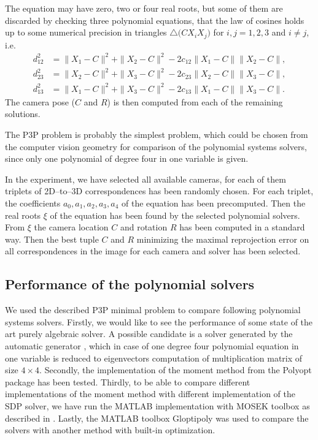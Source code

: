 The equation  may have zero, two or four real roots, but some of them are discarded by checking three polynomial equations, that the law of cosines holds up to some numerical precision in triangles $\triangle\big(CX_iX_j\big)$ for $i,j=1,2,3$ and $i\neq j$, i.e.
\begin{align}
  d_{12}^2 &= \|X_1-C\|^2 + \|X_2-C\|^2 - 2c_{12}\|X_1-C\|\|X_2-C\|,\\
  d_{23}^2 &= \|X_2-C\|^2 + \|X_3-C\|^2 - 2c_{23}\|X_2-C\|\|X_3-C\|,\\
  d_{13}^2 &= \|X_1-C\|^2 + \|X_3-C\|^2 - 2c_{13}\|X_1-C\|\|X_3-C\|.
\end{align}
The camera pose ($C$ and $R$) is then computed from each of the remaining solutions.

The P3P problem is probably the simplest problem, which could be chosen from the computer vision geometry for comparison of the polynomial systems solvers, since only one polynomial of degree four in one variable is given.


In the experiment, we have selected all available \importAppPPPNumCameras{} cameras, for each of them \importAppPPPNumPoints{} triplets of 2D--to--3D correspondences has been randomly chosen.
For each triplet, the coefficients $a_0, a_1, a_2, a_3, a_4$ of the equation  has been precomputed.
Then the real roots $\xi$  of the equation  has been found by the selected polynomial solvers.
From $\xi$ the camera location $C$ and rotation $R$ has been computed in a standard way.
Then the best tuple $C$ and $R$ minimizing the maximal reprojection error on all correspondences in the image for each camera and solver has been selected.

\subsection{Performance of the polynomial solvers}
We used the described P3P minimal problem to compare following polynomial systems solvers.
Firstly, we would like to see the performance of some state of the art purely algebraic solver.
A possible candidate is a solver generated by the automatic generator \cite{autogen}, which in case of one degree four polynomial equation in one variable is reduced to eigenvectors computation of multiplication matrix of size $4\times4$.
Secondly, the implementation of the moment method from the Polyopt package has been tested.
Thirdly, to be able to compare different implementations of the moment method with different implementation of the SDP solver, we have run the MATLAB implementation with MOSEK toolbox as described in .
Lastly, the MATLAB toolbox Gloptipoly \cite{gloptipoly} was used to compare the solvers with another method with built-in optimization.

